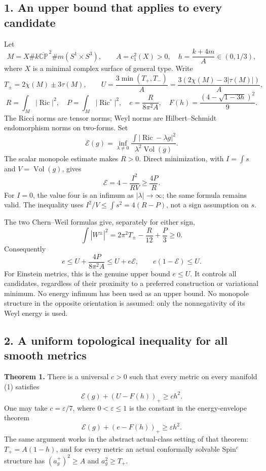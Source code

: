 \documentclass[
  10pt,
]{article}
\begin{document}
\hypertarget{an-upper-bound-that-applies-to-every-candidate}{%
\subsection{1. An upper bound that applies to every
candidate}\label{an-upper-bound-that-applies-to-every-candidate}}

Let \[
 M=X\#k\overline{\mathbb{CP}}^{\,2}\#m(S^1\times S^3),\qquad
 A=c_1^2(X)>0,\quad h=\frac{k+4m}{A}\in(0,1/3),
 \tag{1}
\] where \(X\) is a minimal complex surface of general type. Write \[
 T_\pm=2\chi(M)\pm3\tau(M),\qquad
 U=\frac{3\min(T_+,T_-)}{A}
   =\frac{3(2\chi(M)-3|\tau(M)|)}{A},
\] \[
 R=\int_M|\operatorname{Ric}|^2,\quad
 P=\int_M|\operatorname{Ric}^{\circ}|^2,\quad
 e=\frac{R}{8\pi^2A},\quad
 F(h)=\frac{(4-\sqrt{1-3h})^2}{9}.
 \tag{2}
\] The Ricci norms are tensor norms; Weyl norms are Hilbert--Schmidt
endomorphism norms on two-forms. Set \[
 \mathcal E(g)=\inf_{\lambda\ne0}
 \frac{\int|\operatorname{Ric}-\lambda g|^2}
      {\lambda^2\operatorname{Vol}(g)}.
 \tag{3}
\] The scalar monopole estimate makes \(R>0\). Direct minimization, with
\(I=\int s\) and \(V=\operatorname{Vol}(g)\), gives \[
 \mathcal E=4-\frac{I^2}{RV}\ge\frac{4P}{R}.
 \tag{4}
\] For \(I=0\), the value four is an infimum as \(|\lambda|\to\infty\);
the same formula remains valid. The inequality uses
\(I^2/V\le\int s^2=4(R-P)\), not a sign assumption on \(s\).

The two Chern--Weil formulas give, separately for either sign, \[
 \int|W^\pm|^2=2\pi^2T_\pm-\frac{R}{12}+\frac P3\ge0.
\] Consequently \[
 e\le U+\frac{4P}{8\pi^2A}\le U+e\mathcal E,
 \qquad\boxed{e(1-\mathcal E)\le U.}
 \tag{5}
\] For Einstein metrics, this is the genuine upper bound \(e\le U\). It
controls all candidates, regardless of their proximity to a preferred
construction or variational minimum. No energy infimum has been used as
an upper bound. No monopole structure in the opposite orientation is
assumed: only the nonnegativity of its Weyl energy is used.

\hypertarget{a-uniform-topological-inequality-for-all-smooth-metrics}{%
\subsection{2. A uniform topological inequality for all smooth
metrics}\label{a-uniform-topological-inequality-for-all-smooth-metrics}}

\textbf{Theorem 1.} There is a universal \(c>0\) such that every metric
on every manifold (1) satisfies \[
 \boxed{\mathcal E(g)+(U-F(h))_+\ge c h^2.}
 \tag{6}
\] One may take \(c=\varepsilon/7\), where \(0<\varepsilon\le1\) is the
constant in the energy-envelope theorem \[
 \mathcal E(g)+(e-F(h))_+\ge\varepsilon h^2.
 \tag{7}
\] The same argument works in the abstract actual-class setting of that
theorem: \(T_+=A(1-h)\), and for every metric an actual conformally
solvable Spin\(^c\) structure has \((a_g^+)^2\ge A\) and
\(a_g^2\ge T_+\).
\end{document}
